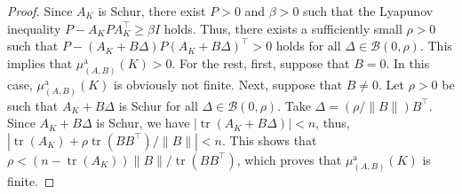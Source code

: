 \documentclass[10pt,a4paper]{amsart}
\DeclareMathOperator{\tr}{tr}
\begin{document}
\begin{proof}
Since $A_K$ is Schur, there exist $P>0$ and \mbox{$\beta>0$} such that the Lyapunov inequality \mbox{$P-A_K PA_K^\top \geq\beta I$} holds. Thus, there exists a sufficiently small $\rho>0$ such that \mbox{$P-(A_K+B\Delta) P(A_K+B\Delta)^\top>0$} holds for all \mbox{$\Delta\in\mathcal{B}(0,\rho)$}. This implies that $\mu_{(A,B)}^{\text{a}}(K)>0$. For the rest, first, suppose that $B=0$. In this case, $\mu_{(A,B)}^{\text{a}}(K)$ is obviously not finite. Next, suppose that $B\neq 0$. Let $\rho>0$ be such that $A_K+B\Delta$ is Schur for all $\Delta\in\mathcal{B}(0,\rho)$. Take $\Delta=(\rho /\|B\|)B^\top$. Since $A_K+B\Delta$ is Schur, we have $|\tr(A_K+B\Delta)|< n$, thus,
$\left|\tr(A_K)+\rho\tr(BB^\top)/\|B\|\right|< n$. This shows that $\rho< (n-\tr(A_K))\|B\|/\tr(BB^\top)$, which proves that $\mu_{(A,B)}^{\text{a}}(K)$ is finite. 
\end{proof}
\end{document}
